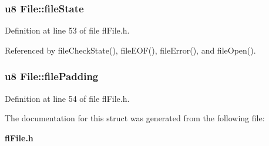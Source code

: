 \subsubsection{\setlength{\rightskip}{0pt plus 5cm}u8 {\bf File::file\-State}}\label{structFile_4fe0b1921d4ebeea42c887782bf84e3a}




Definition at line 53 of file fl\-File.h.

Referenced by file\-Check\-State(), file\-EOF(), file\-Error(), and file\-Open().
\subsubsection{\setlength{\rightskip}{0pt plus 5cm}u8 {\bf File::file\-Padding}}\label{structFile_a4c273959e735ce2a2366f13ddc52791}




Definition at line 54 of file fl\-File.h.

The documentation for this struct was generated from the following file:\begin{CompactItemize}
\item 
{\bf fl\-File.h}\end{CompactItemize}
